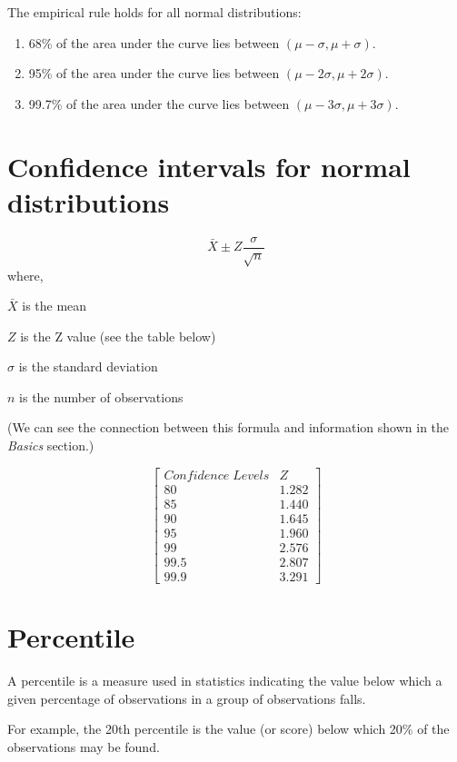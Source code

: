 \documentclass[
]{book}
\begin{document}
The empirical rule holds for all normal distributions:

\begin{enumerate}
\def\labelenumi{(\arabic{enumi})}
\item
  68\% of the area under the curve lies between \((\mu-\sigma,\mu+\sigma)\).
\item
  95\% of the area under the curve lies between \((\mu-2\sigma,\mu+2\sigma)\).
\item
  99.7\% of the area under the curve lies between \((\mu-3\sigma,\mu+3\sigma)\).
\end{enumerate}

\hypertarget{confidence-intervals-for-normal-distributions}{%
\section{Confidence intervals for normal distributions}\label{confidence-intervals-for-normal-distributions}}

\[\bar{X} \pm Z \frac{\sigma}{\sqrt{n}}\]
where,

\(\bar{X}\) is the mean

\(Z\) is the Z value (see the table below)

\(\sigma\) is the standard deviation

\(n\) is the number of observations

(We can see the connection between this formula and information shown in the \emph{Basics} section.)

\[\begin{bmatrix}
Confidence \; Levels & Z \\
80  & 1.282 \\
85 & 1.440 \\
90 & 1.645 \\
95 & 1.960 \\
99 & 2.576 \\
99.5 & 2.807 \\
99.9 & 3.291 \end{bmatrix}\]

\hypertarget{percentile}{%
\section{Percentile}\label{percentile}}

A percentile is a measure used in statistics indicating the value below which a given percentage of observations in a group of observations falls.

For example, the 20th percentile is the value (or score) below which 20\% of the observations may be found.
\end{document}
